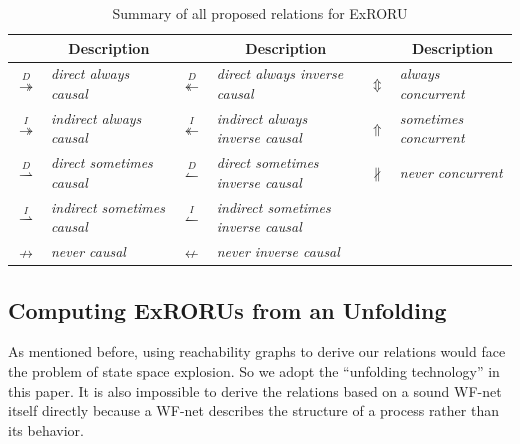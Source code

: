 \documentclass{llncs}
\begin{document}
\begin{table}[htbp]
\centering
\caption{Summary of all proposed relations for ExRORU\label{tab:relations}}
	\begin{tabular}{|c|l||c|l||c|l|} \hline
		& \multicolumn{1}{|c||}{\multirow{1}{*}{Description}} & & \multicolumn{1}{|c||}{\multirow{1}{*}{Description}} & & \multicolumn{1}{|c|}{\multirow{1}{*}{Description}}\\ \hline
		$\overset{D}{\twoheadrightarrow}$ & \textit{direct always causal} & $\overset{D}{\twoheadleftarrow}$ & \textit{direct always inverse causal} & $\Updownarrow$ & \textit{always concurrent}\\
		$\overset{I}{\twoheadrightarrow}$ & \textit{indirect always causal} & $\overset{I}{\twoheadleftarrow}$ & \textit{indirect always inverse causal} & $\Uparrow$ & \textit{sometimes concurrent}\\
		$\overset{D}{\rightharpoonup}$ & \textit{direct sometimes causal} & $\overset{D}{\leftharpoonup}$ & \textit{direct sometimes inverse causal} & $\nparallel$ & \textit{never concurrent}\\
		$\overset{I}{\rightharpoonup}$ & \textit{indirect sometimes causal} & $\overset{I}{\leftharpoonup}$ & \textit{indirect sometimes inverse causal} & & \\
		$\nrightarrow$ & \textit{never causal} & $\nleftarrow$ & \textit{never inverse causal} & & \\
		\hline
	\end{tabular}
\end{table}

\subsection{Computing ExRORUs from an Unfolding}\label{subsec:computationOfRelations}
As mentioned before, using reachability graphs to derive our relations would face the problem of state space explosion. %
So we adopt the ``unfolding technology'' in this paper. It is also impossible to derive the relations based on a sound WF-net itself directly because a WF-net describes the structure of a process rather than its behavior.
\end{document}
